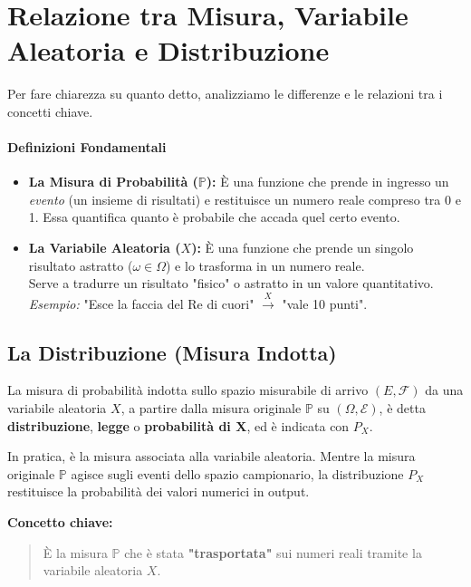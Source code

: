 \section{Relazione tra Misura, Variabile Aleatoria e Distribuzione}

Per fare chiarezza su quanto detto, analizziamo le differenze e le relazioni tra i concetti chiave.

\paragraph{Definizioni Fondamentali}
\begin{itemize}
    \item \textbf{La Misura di Probabilità ($\mathbb{P}$):} È una funzione che prende in ingresso un \textit{evento} (un insieme di risultati) e restituisce un numero reale compreso tra 0 e 1. Essa quantifica quanto è probabile che accada quel certo evento.
    
    \item \textbf{La Variabile Aleatoria ($X$):} È una funzione che prende un singolo risultato astratto ($\omega \in \Omega$) e lo trasforma in un numero reale.
    \\Serve a tradurre un risultato "fisico" o astratto in un valore quantitativo.
    \\\textit{Esempio:} "Esce la faccia del Re di cuori" $\xrightarrow{X}$ "vale 10 punti".
\end{itemize}

\subsection{La Distribuzione (Misura Indotta)}

La misura di probabilità indotta sullo spazio misurabile di arrivo $(E, \mathcal{F})$ da una variabile aleatoria $X$, a partire dalla misura originale $\mathbb{P}$ su $(\Omega, \mathcal{E})$, è detta \textbf{distribuzione}, \textbf{legge} o \textbf{probabilità di X}, ed è indicata con $P_X$.

In pratica, è la misura associata alla variabile aleatoria. Mentre la misura originale $\mathbb{P}$ agisce sugli eventi dello spazio campionario, la distribuzione $P_X$ restituisce la probabilità dei valori numerici in output.

\textbf{Concetto chiave:}
\begin{quote}
    È la misura $\mathbb{P}$ che è stata \textbf{"trasportata"} sui numeri reali tramite la variabile aleatoria $X$.
\end{quote}


